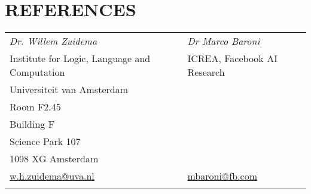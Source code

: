 \section{REFERENCES}
% 
\begin{tabular}{ll}
\emph{Dr. Willem Zuidema} & \emph{Dr Marco Baroni} \\
Institute for Logic, Language and Computation & ICREA, Facebook AI Research\\
Universiteit van Amsterdam & \\
Room F2.45 & \\
Building F & \\
Science Park 107 & \\
1098 XG Amsterdam & \\
\href{mailto:w.h.zuidema@uva.nl}{w.h.zuidema@uva.nl}& \href{mailto:mbaroni@fb.com}{mbaroni@fb.com }\\\\
\end{tabular}
